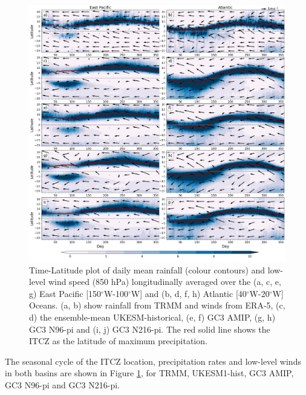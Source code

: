 \begin{figure}[t!]
\centering
 \includegraphics[width=\linewidth]{figures/fig3_p2_v3.png}
\caption[Seasonal evolution of Atlantic and Pacific ITCZ]{ Time-Latitude plot of daily mean rainfall (colour contours) and low-level wind speed (850 hPa) longitudinally averaged over the (a, c, e, g) East Pacific [150$^\circ$W-100$^\circ$W] and (b, d, f, h) Atlantic [40$^\circ$W-20$^\circ$W] Oceans. (a, b) show rainfall from TRMM and winds from ERA-5, (c, d) the ensemble-mean UKESM-historical, (e, f) GC3 AMIP, (g, h) GC3 N96-pi and (i, j) GC3 N216-pi. The red solid line shows the ITCZ as the latitude of maximum precipitation.  }
\label{fig:4}
\end{figure}


The seasonal cycle of the ITCZ location, precipitation rates and low-level winds in both basins are shown in Figure \ref{fig:4}, for TRMM, UKESM1-hist, GC3 AMIP, GC3 N96-pi and GC3 N216-pi.   %

